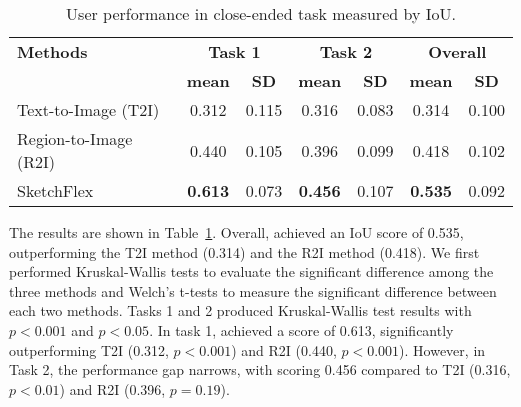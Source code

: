 \begin{table}[ht] \small
    \centering
    \caption{User performance in close-ended task measured by IoU.}
    \vspace{-2mm}
    \begin{tabular}{lcccc|cc}
    \hline 
    \textbf{Methods} & \multicolumn{2}{c}{\textbf{Task 1}} & \multicolumn{2}{c}{\textbf{Task 2}} & \multicolumn{2}{c}{\textbf{Overall}} \\
    & \textbf{mean} & \textbf{SD} & \textbf{mean} & \textbf{SD} & \textbf{mean} & \textbf{SD} \\
    \hline 
    Text-to-Image (T2I) & 0.312 & 0.115 & 0.316 & 0.083 & 0.314 & 0.100 \\
    Region-to-Image (R2I) & 0.440 & 0.105 & 0.396 & 0.099 & 0.418 & 0.102 \\
    SketchFlex  & \textbf{0.613} & 0.073 & \textbf{0.456} & 0.107 & \textbf{0.535} & 0.092 \\
    \hline
    \end{tabular}
    \label{tab:IoU}
\end{table}


The results are shown in Table~\ref{tab:IoU}.
Overall, \tool achieved an IoU score of 0.535, outperforming the T2I method (0.314) and the R2I method (0.418). 
We first performed Kruskal-Wallis tests to evaluate the significant difference among the three methods and Welch’s t-tests to measure the significant difference between each two methods.
Tasks 1 and 2 produced Kruskal-Wallis test results with $p<0.001$ and $p<0.05$.
In task 1, \tool achieved a score of 0.613, significantly outperforming T2I (0.312, $p<0.001$) and R2I (0.440, $p<0.001$). 
However, in Task 2, the performance gap narrows, with \tool scoring 0.456 compared to T2I (0.316, $p<0.01$) and R2I (0.396, $p = 0.19$).

